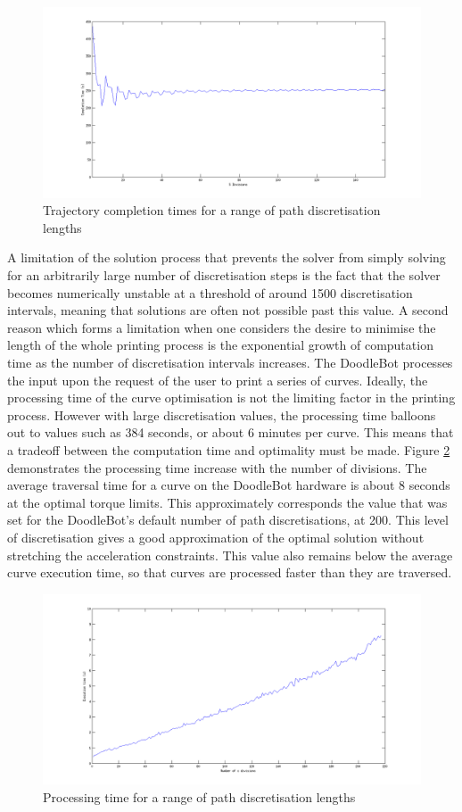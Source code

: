 \begin{figure}[htbp]  
\includegraphics[width=\textwidth]{figures/performance/sDivisions.png}
\caption[Trajectory completion time for a range of path discretisation lengths]{Trajectory completion times for a range of path discretisation lengths
\label{fig:sDivisions}}
\end{figure} 

A limitation of the solution process that prevents the solver from simply solving for an arbitrarily large number of discretisation steps is the fact that the solver becomes numerically unstable at a threshold of around 1500 discretisation intervals, meaning that solutions are often not possible past this value. A second reason which forms a limitation when one considers the desire to minimise the length of the whole printing process is the exponential growth of computation time as the number of discretisation intervals increases. The DoodleBot processes the input upon the request of the user to print a series of curves. Ideally, the processing time of the curve optimisation is not the limiting factor in the printing process. However with large discretisation values, the processing time balloons out to values such as 384 seconds, or about 6 minutes per curve. This means that a tradeoff between the computation time and optimality must be made. Figure \ref{fig:sDivTime} demonstrates the processing time increase with the number of divisions. The average traversal time for a curve on the DoodleBot hardware is about 8 seconds at the optimal torque limits. This approximately corresponds the value that was set for the DoodleBot's default number of path discretisations, at 200. This level of discretisation gives a good approximation of the optimal solution without stretching the acceleration constraints. This value also remains below the average curve execution time, so that curves are processed faster than they are traversed.

\begin{figure}[htbp]  
\includegraphics[width=\textwidth]{figures/performance/sDivTime.png}
\caption[Processing time for a range of path discretisation lengths]{Processing time for a range of path discretisation lengths
\label{fig:sDivTime}}
\end{figure} 



